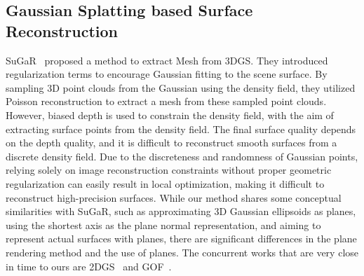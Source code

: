 \documentclass[lettersize,journal]{IEEEtran}
\begin{document}
\subsection{Gaussian Splatting based Surface Reconstruction}
SuGaR~\cite{guedon2023sugar} proposed a method to extract Mesh from 3DGS. They introduced regularization terms to encourage Gaussian fitting to the scene surface. By sampling 3D point clouds from the Gaussian using the density field, they utilized Poisson reconstruction to extract a mesh from these sampled point clouds. 
\textcolor{r}{
However, biased depth is used to constrain the density field, with the aim of extracting surface points from the density field. The final surface quality depends on the depth quality, and it is difficult to reconstruct smooth surfaces from a discrete density field. Due to the discreteness and randomness of Gaussian points, relying solely on image reconstruction constraints without proper geometric regularization can easily result in local optimization, making it difficult to reconstruct high-precision surfaces. While our method shares some conceptual similarities with SuGaR, such as approximating 3D Gaussian ellipsoids as planes, using the shortest axis as the plane normal representation, and aiming to represent actual surfaces with planes, there are significant differences in the plane rendering method and the use of planes. The concurrent works that are very close in time to ours are 2DGS~\cite{huang20242d} and GOF~\cite{yu2024gaussian}.}
\end{document}
